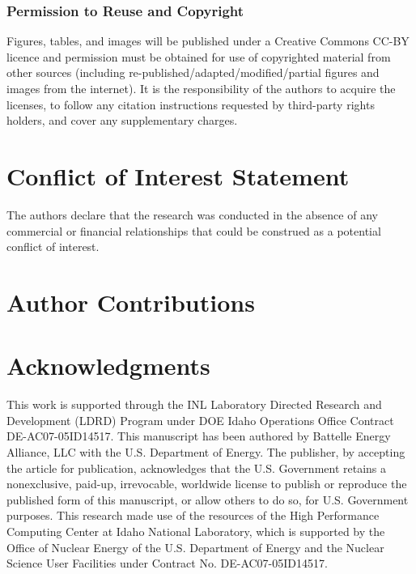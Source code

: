 \documentclass[utf8]{frontiersSCNS} %
\begin{document}
\subsubsection{Permission to Reuse and Copyright}
Figures, tables, and images will be published under a Creative Commons CC-BY licence and permission must be obtained for use of copyrighted material from other sources (including re-published/adapted/modified/partial figures and images from the internet). It is the responsibility of the authors to acquire the licenses, to follow any citation instructions requested by third-party rights holders, and cover any supplementary charges.

\section*{Conflict of Interest Statement}

The authors declare that the research was conducted in the absence of any commercial or financial relationships that could be construed as a potential conflict of interest.

\section*{Author Contributions}


\section*{Acknowledgments}
This work is supported through the INL Laboratory Directed Research and Development (LDRD) Program under DOE Idaho Operations Office Contract DE-AC07-05ID14517. This manuscript has been authored by Battelle Energy Alliance, LLC with the U.S. Department of Energy. The publisher, by accepting the article for publication, acknowledges that the U.S. Government retains a nonexclusive, paid-up, irrevocable, worldwide license to publish or reproduce the published form of this manuscript, or allow others to do so, for U.S. Government purposes. This research made use of the resources of the High Performance Computing Center at Idaho National Laboratory, which is supported by the Office of Nuclear Energy of the U.S. Department of Energy and the Nuclear Science User Facilities under Contract No. DE-AC07-05ID14517. 


 

\end{document}
